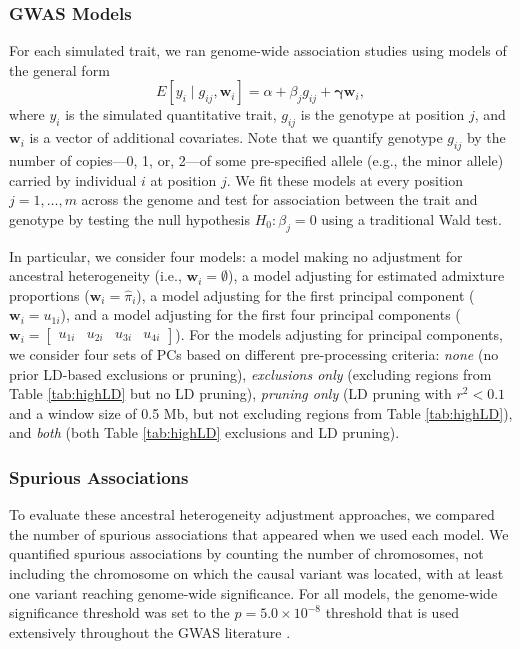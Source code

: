 \documentclass[12pt]{article}
\begin{document}
\subsubsection{GWAS Models}

For each simulated trait, we ran genome-wide association studies using models of the general form
$$E[y_i \mid g_{ij}, \mathbf{w}_i] = \alpha + \beta_j g_{ij} + \boldsymbol\gamma \mathbf{w}_i,$$
where $y_i$ is the simulated quantitative trait, $g_{ij}$ is the genotype at position $j$,  and $\mathbf{w}_i$ is a vector of additional covariates.
Note that we quantify genotype $g_{ij}$ by the number of copies---0, 1, or, 2---of some pre-specified allele (e.g., the minor allele) carried by individual $i$ at position $j$.
We fit these models at every position $j = 1, \dots, m$ across the genome and test for association between the trait and genotype by testing the null hypothesis $H_0: \beta_j = 0$ using a traditional Wald test.

In particular, we consider four models: a model making no adjustment for ancestral heterogeneity (i.e., $\mathbf{w}_i = \emptyset$), a model adjusting for estimated admixture proportions ($\mathbf{w}_i = \hat\pi_i$), a model adjusting for the first principal component ($\mathbf{w}_i = u_{1i}$), and a model adjusting for the first four principal components ($\mathbf{w}_i = \begin{bmatrix} u_{1i} & u_{2i} & u_{3i} & u_{4i} \end{bmatrix}$). 
For the models adjusting for principal components, we consider four sets of PCs based on different pre-processing criteria: \textit{none} (no prior LD-based exclusions or pruning), \textit{exclusions only} (excluding regions from Table \ref{tab:highLD} but no LD pruning), \textit{pruning only} (LD pruning with $r^2 < 0.1$ and a window size of 0.5 Mb, but not excluding regions from Table \ref{tab:highLD}), and \textit{both} (both Table \ref{tab:highLD} exclusions and LD pruning).

\subsubsection{Spurious Associations}

To evaluate these ancestral heterogeneity adjustment approaches, we compared the number of spurious associations that appeared when we used each model.
We quantified spurious associations by counting the number of chromosomes, not including the chromosome on which the causal variant was located, with at least one variant reaching genome-wide significance.
For all models, the genome-wide significance threshold was set to the $p = 5.0 \times 10^{-8}$ threshold that is used extensively throughout the GWAS literature \cite{peer2008, jannot2015}.
\end{document}

